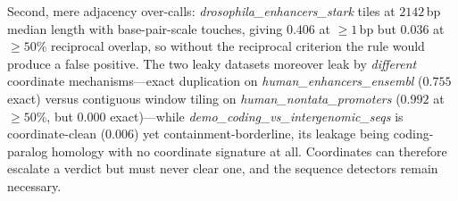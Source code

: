 Second, mere adjacency over-calls: \textit{drosophila\_enhancers\_stark} tiles at $2142$\,bp median length with base-pair-scale touches, giving $0.406$ at ${\ge}1$\,bp but $0.036$ at $\ge50\%$ reciprocal overlap, so without the reciprocal criterion the rule would produce a false positive. The two leaky datasets moreover leak by \emph{different} coordinate mechanisms---exact duplication on \textit{human\_enhancers\_ensembl} ($0.755$ exact) versus contiguous window tiling on \textit{human\_nontata\_promoters} ($0.992$ at $\ge50\%$, but $0.000$ exact)---while \textit{demo\_coding\_vs\_intergenomic\_seqs} is coordinate-clean ($0.006$) yet containment-borderline, its leakage being coding-paralog homology with no coordinate signature at all. Coordinates can therefore escalate a verdict but must never clear one, and the sequence detectors remain necessary.

